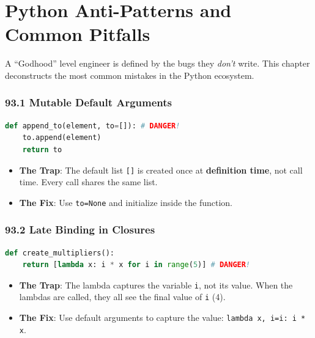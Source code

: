 \hypertarget{python-anti-patterns-and-common-pitfalls}{%
\chapter{Python Anti-Patterns and Common
Pitfalls}\label{python-anti-patterns-and-common-pitfalls}}

A ``Godhood'' level engineer is defined by the bugs they \emph{don't}
write. This chapter deconstructs the most common mistakes in the Python
ecosystem.

\hypertarget{mutable-default-arguments}{%
\subsection{93.1 Mutable Default
Arguments}\label{mutable-default-arguments}}

\begin{lstlisting}[language=Python]
def append_to(element, to=[]): # DANGER!
    to.append(element)
    return to
\end{lstlisting}

\begin{itemize}
\tightlist
\item
  \textbf{The Trap}: The default list \passthrough{\lstinline![]!} is
  created once at \textbf{definition time}, not call time. Every call
  shares the same list.
\item
  \textbf{The Fix}: Use \passthrough{\lstinline!to=None!} and initialize
  inside the function.
\end{itemize}

\hypertarget{late-binding-in-closures}{%
\subsection{93.2 Late Binding in
Closures}\label{late-binding-in-closures}}

\begin{lstlisting}[language=Python]
def create_multipliers():
    return [lambda x: i * x for i in range(5)] # DANGER!
\end{lstlisting}

\begin{itemize}
\tightlist
\item
  \textbf{The Trap}: The lambda captures the variable
  \passthrough{\lstinline!i!}, not its value. When the lambdas are
  called, they all see the final value of \passthrough{\lstinline!i!}
  (4).
\item
  \textbf{The Fix}: Use default arguments to capture the value:
  \passthrough{\lstinline!lambda x, i=i: i * x!}.
\end{itemize}

